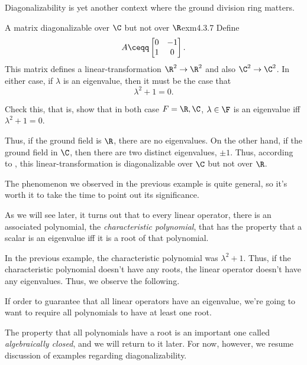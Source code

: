Diagonalizability is yet another context where the ground division ring matters.
\begin{exm}{A matrix diagonalizable over $\C$ but not over $\R$}{exm4.3.7}
	Define
	\begin{equation}
		A\ceqq \begin{bmatrix}0 & -1 \\ 1 & 0\end{bmatrix}.
	\end{equation}
	This matrix defines a linear-transformation $\R ^2\rightarrow \R ^2$ and also $\C ^2\rightarrow \C ^2$.  In either case, if $\lambda$ is an eigenvalue, then it must be the case that
	\begin{equation}
		\lambda ^2+1=0.
	\end{equation}
	\begin{exr}[breakable=false]{}{}
		Check this, that is, show that in both case $F=\R ,\C$, $\lambda \in \F$ is an eigenvalue iff $\lambda ^2+1=0$.
	\end{exr}

	Thus, if the ground field is $\R$, there are no eigenvalues.  On the other hand, if the ground field in $\C$, then there are two distinct eigenvalues, $\pm 1$.  Thus, according to , this linear-transformation is diagonalizable over $\C$ but not over $\R$.
\end{exm}
The phenomenon we observed in the previous example is quite general, so it's worth it to take the time to point out its significance.
\begin{displayquote}
	As we will see later, it turns out that to every linear operator, there is an associated polynomial, the \emph{characteristic polynomial}, that has the property that a scalar is an eigenvalue iff it is a root of that polynomial. 
\end{displayquote}
In the previous example, the characteristic polynomial was $\lambda ^2+1$.  Thus, if the characteristic polynomial doesn't have any roots, the linear operator doesn't have any eigenvalues.  Thus, we observe the following.
\begin{displayquote}
	If order to guarantee that all linear operators have an eigenvalue, we're going to want to require all polynomials to have at least one root.
\end{displayquote}
The property that all polynomials have a root is an important one called \emph{algebraically closed}, and we will return to it later.  For now, however, we resume discussion of examples regarding diagonalizability.
